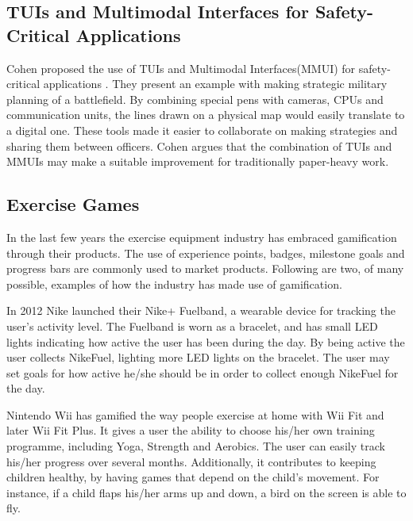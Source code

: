 \subsection{TUIs and Multimodal Interfaces for Safety-Critical Applications}
Cohen \etal{} proposed the use of TUIs and Multimodal Interfaces(MMUI) for safety-critical applications \cite{cohen2004tangible}. They present an example with making strategic military planning of a battlefield. By combining special pens with cameras, CPUs and communication units, the lines drawn on a physical map would easily translate to a digital one. These tools made it easier to collaborate on making strategies and sharing them between officers. Cohen \etal{} argues that the combination of TUIs and MMUIs may make a suitable improvement for traditionally paper-heavy work.

\subsection{Exercise Games}
\label{sec:exercisegames}
In the last few years the exercise equipment industry has embraced gamification through their products. The use of experience points, badges, milestone goals and progress bars are commonly used to market products. Following are two, of many possible, examples of how the industry has made use of gamification. 

In 2012 Nike launched their Nike+ Fuelband, a wearable device for tracking the user's activity level. The Fuelband is worn as a bracelet, and has small LED lights indicating how active the user has been during the day. By being active the user collects NikeFuel\texttrademark, lighting more LED lights on the bracelet. The user may set goals for how active he/she should be in order to collect enough NikeFuel for the day. 

Nintendo Wii has gamified the way people exercise at home with Wii Fit and later Wii Fit Plus. It gives a user the ability to choose his/her own training programme, including Yoga, Strength and Aerobics. The user can easily track his/her progress over several months. Additionally, it contributes to keeping children healthy, by having games that depend on the child's movement. For instance, if a child flaps his/her arms up and down, a bird on the screen is able to fly.
 